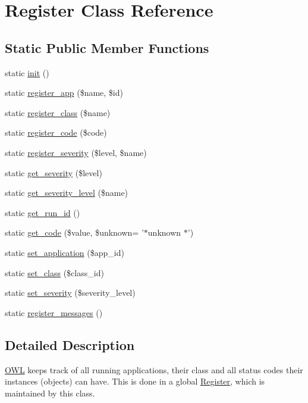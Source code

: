 \section{Register Class Reference}
\label{classRegister}
\subsection*{Static Public Member Functions}
\begin{DoxyCompactItemize}
\item 
static \hyperlink{classRegister_a5c34c30e9e6ce4dea2dbb02f55e9278a}{init} ()
\item 
static \hyperlink{classRegister_ac547568c4a7272fdaf65cb2825eccec3}{register\_\-app} (\$name, \$id)
\item 
static \hyperlink{classRegister_a58300f74d002f1306a03baf12af0f02c}{register\_\-class} (\$name)
\item 
static \hyperlink{classRegister_a875fd1f32f0746aa9e0e00b053c7389a}{register\_\-code} (\$code)
\item 
static \hyperlink{classRegister_ac22a104eefa471675cb28ee20821eaad}{register\_\-severity} (\$level, \$name)
\item 
static \hyperlink{classRegister_ae71e10bddb03483b54ad22b9edb95b7c}{get\_\-severity} (\$level)
\item 
static \hyperlink{classRegister_a70490e59a4a3b910d259b8a4287c3e91}{get\_\-severity\_\-level} (\$name)
\item 
static \hyperlink{classRegister_a041706fafb409a31f125d2075501e82e}{get\_\-run\_\-id} ()
\item 
static \hyperlink{classRegister_abd8556b87ac48f8d8b3abeef6285c8f5}{get\_\-code} (\$value, \$unknown= '$\ast$unknown $\ast$')
\item 
static \hyperlink{classRegister_ad4d61787414f7d64d1e3420f0fdf3f91}{set\_\-application} (\$app\_\-id)
\item 
static \hyperlink{classRegister_a58e49ccb1fe4e441d0329e879c922aa0}{set\_\-class} (\$class\_\-id)
\item 
static \hyperlink{classRegister_a0adde8d67d77b9b4d66156272cb48ae4}{set\_\-severity} (\$severity\_\-level)
\item 
static \hyperlink{classRegister_a688c665a20294826a762cf552b4a00fc}{register\_\-messages} ()
\end{DoxyCompactItemize}


\subsection{Detailed Description}
\hyperlink{classOWL}{OWL} keeps track of all running applications, their class and all status codes their instances (objects) can have. This is done in a global \hyperlink{classRegister}{Register}, which is maintained by this class. 

